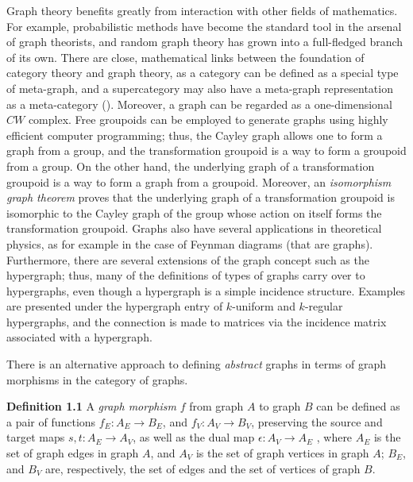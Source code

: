 \documentclass[12pt]{article}
\begin{document}
Graph theory benefits greatly from interaction with other fields of mathematics. For example, probabilistic methods have become the standard tool in the arsenal of graph theorists, and random graph theory has grown into a full-fledged branch of its own. There are close, mathematical links between the foundation of category theory and
graph theory, as a category can be defined as a special type of meta-graph, and a supercategory
may also have a meta-graph representation as a meta-category (\cite{MacLane2000}). Moreover, a graph can be regarded 
as a one-dimensional $CW$ complex. Free groupoids can be employed to generate graphs using highly efficient computer programming; thus, the Cayley graph allows one to form a graph from a group, and the transformation groupoid is a
way to form a groupoid from a group. On the other hand, the underlying graph of a transformation groupoid
is a way to form a graph from a groupoid. Moreover, an \emph{isomorphism graph theorem} proves that the underlying
graph of a transformation groupoid is isomorphic to the Cayley graph of the group whose action on itself forms the
transformation groupoid. Graphs also have several applications in theoretical physics, as for example in the case of Feynman diagrams (that are graphs). Furthermore, there are several extensions of the graph concept such as the hypergraph; thus, many of the definitions of types of graphs carry over to hypergraphs, even though a hypergraph is a simple incidence structure. Examples are presented under the hypergraph entry of $k$-uniform and $k$-regular hypergraphs, and the connection is made to matrices via the incidence matrix associated with a hypergraph. 

There is an alternative approach to defining \emph{abstract} graphs in terms of graph morphisms
in the category of graphs. 

\textbf{Definition 1.1}
A \emph{graph morphism} $f$ from graph $A$ to graph $B$ can be defined as a pair of functions $f_E: A_E \to B_E$, and $f_V: A_V \to B_V$, preserving the source and target maps $s, t: A_E \to A_V$, as well as the dual map 
$\epsilon : A_V \to A_E$ , where $A_E$ is the set of graph edges in graph $A$, and $A_V$ is the set of graph vertices in graph $A$; $B_E$, and $B_V$ are, respectively, the set of edges and the set of vertices of graph $B$.   



%
\end{document}
